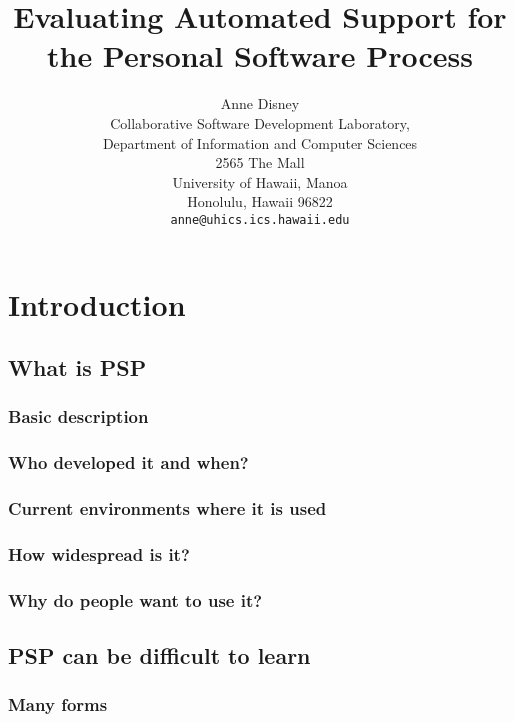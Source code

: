



\title{Evaluating Automated Support for the Personal Software Process}
\author{Anne Disney\\
Collaborative Software Development Laboratory,\\
Department of Information and Computer Sciences\\
2565 The Mall\\
University of Hawaii, Manoa\\
Honolulu, Hawaii   96822\\
{\tt anne@uhics.ics.hawaii.edu}}
\maketitle

\tableofcontents
\chapter{Introduction}
\section{What is PSP}
\subsection{Basic description}
\subsection{Who developed it and when?}
\subsection{Current environments where it is used}
\subsection{How widespread is it?}
\subsection{Why do people want to use it?}
\section{PSP can be difficult to learn}
\subsection{Many forms}

